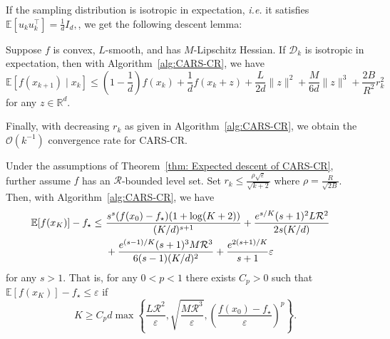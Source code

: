 If the sampling distribution is isotropic in expectation, \textit{i.e.} it satisfies
$
    \mathbb{E}\left[ {u_ku_k^{\top}} \right] = \frac{1}{d}I_d,
$, we get the following descent lemma:
\begin{theorem}
    \label{thm: Expected descent of CARS-CR}
    Suppose $f$ is convex, $L$-smooth, and has $M$-Lipschitz Hessian.
    If $\mathcal{D}_k$ is isotropic in expectation,
    then with Algorithm~\ref{alg:CARS-CR}, we have
    \begin{equation}\label{eq: CR expected bound wrt z}
        \mathbb{E}\left[f(x_{k+1})\mid x_k \right] \leq  \left(1-\frac{1}{d}\right)f(x_k) + \frac{1}{d}f(x_k + z)
        + \frac{L}{2d}\|z\|^2 + \frac{M}{6d}\|z\|^3  + \frac{2B}{R^2}r_k^2
    \end{equation}
    for any $z \in \mathbb{R}^d$.
\end{theorem}

Finally, with decreasing $r_k$ as given in Algorithm~\ref{alg:CARS-CR}, we obtain the $\mathcal{O}(k^{-1})$ convergence rate for CARS-CR.

\begin{theorem}\label{thm: Convergence of CARS-CR}
    Under the assumptions of Theorem~\ref{thm: Expected descent of CARS-CR}, further assume $f$ has an $\mathcal{R}$-bounded level set. Set $r_k \leq \frac{\rho\sqrt{\varepsilon}}{\sqrt{k+2}}$ where $\rho = \frac{R}{\sqrt{2B}}$.
    Then, with Algorithm~\ref{alg:CARS-CR}, we have
    \begin{equation}
        \begin{split}
            \mathbb{E}[f(x_K)] - f_\star \leq
            &~\frac{ s^s (f(x_0)-f_\star) (1+ \log(K+2)) }{(K/d)^{s+1}}
            + \frac{e^{s/K} (s+1)^2 L\mathcal{R}^2  }{2s(K/d)} \cr
            &~+ \frac{e^{(s-1)/K} (s+1)^3 M \mathcal{R}^3  }{6(s-1)(K/d)^2}
            + \frac{e^{2(s+1)/K} }{s+1}\varepsilon
        \end{split}
    \end{equation}
    for any $s > 1$.
    That is, for any $0<p<1$ there exists $C_p > 0$ such that  $\mathbb{E}[f(x_K)] - f_\star \leq \varepsilon$ if
    \begin{equation} \label{eq: CR conv K depending on p}
        K  \geq  C_p d \max \left\{ \frac{L\mathcal{R}^2}{\varepsilon} , \sqrt{\frac{M\mathcal{R}^3}{\varepsilon}} , \left(\frac{f(x_0)-f_\star}{\varepsilon}\right)^{p} \right\}.
    \end{equation}
\end{theorem}